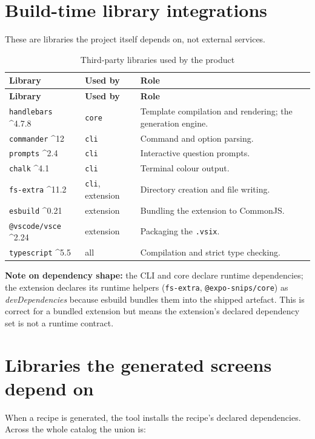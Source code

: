 \section{Build-time library integrations}

These are libraries the project itself depends on, not external services.

\begin{longtable}{@{}L{3.2cm}L{3cm}L{6.4cm}@{}}
\caption{Third-party libraries used by the product}\\
\toprule
\textbf{Library} & \textbf{Used by} & \textbf{Role} \\
\midrule
\endfirsthead
\toprule
\textbf{Library} & \textbf{Used by} & \textbf{Role} \\
\midrule
\endhead
\texttt{handlebars} \^{}4.7.8 & \texttt{core} & Template compilation and
rendering; the generation engine. \\
\texttt{commander} \^{}12 & \texttt{cli} & Command and option parsing. \\
\texttt{prompts} \^{}2.4 & \texttt{cli} & Interactive question prompts. \\
\texttt{chalk} \^{}4.1 & \texttt{cli} & Terminal colour output. \\
\texttt{fs-extra} \^{}11.2 & \texttt{cli}, extension & Directory creation and file
writing. \\
\texttt{esbuild} \^{}0.21 & extension & Bundling the extension to CommonJS. \\
\texttt{@vscode/vsce} \^{}2.24 & extension & Packaging the \texttt{.vsix}. \\
\texttt{typescript} \^{}5.5 & all & Compilation and strict type checking. \\
\bottomrule
\end{longtable}

\textbf{Note on dependency shape:} the CLI and core declare runtime
dependencies; the extension declares its runtime helpers (\texttt{fs-extra},
\texttt{@expo-snips/core}) as \emph{devDependencies} because esbuild bundles them
into the shipped artefact. This is correct for a bundled extension but means the
extension's declared dependency set is not a runtime contract.

\section{Libraries the generated screens depend on}

When a recipe is generated, the tool installs the recipe's declared
dependencies. Across the whole catalog the union is:

